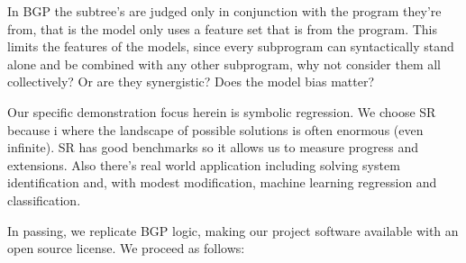In BGP the subtree's are judged only in conjunction with the program they're from, that is the model only uses a feature set that is  from the program. This limits the features of the models, since every subprogram can syntactically stand alone and be combined with any other subprogram, why not consider them all collectively? Or are they synergistic?  Does the model bias matter?

Our specific demonstration focus herein is  symbolic regression. We choose SR because i where the landscape of possible solutions is often enormous (even infinite). SR has good benchmarks so it allows us to measure progress and extensions. Also there's real world application including solving system identification and, with modest modification, machine learning regression and classification.

In passing, we replicate BGP logic, making our project software available with an open source license.
 We proceed as follows: 

